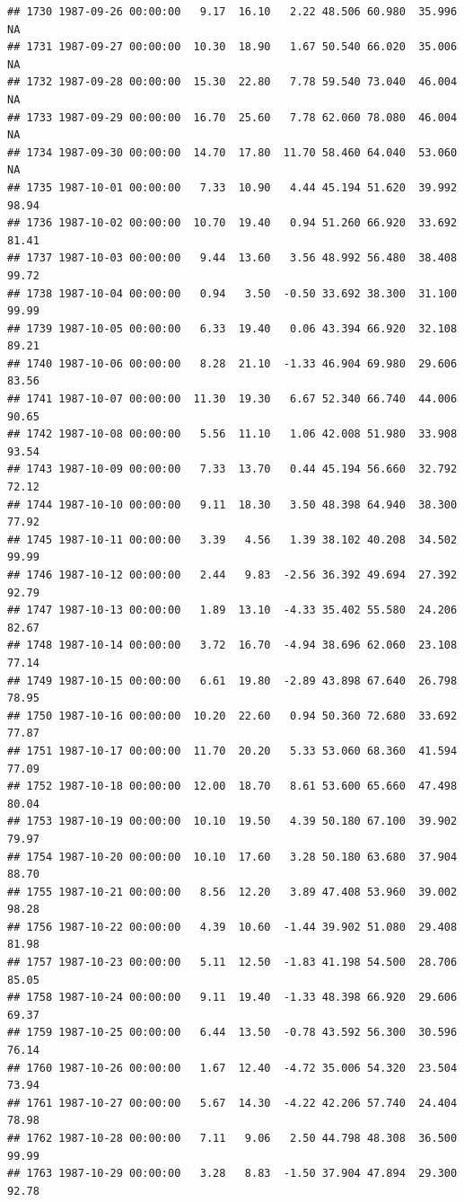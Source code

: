 \documentclass{article}\usepackage{graphicx, color}
\makeatletter
\newenvironment{kframe}{%
 \def\at@end@of@kframe{}%
 \ifinner\ifhmode%
  \def\at@end@of@kframe{\end{minipage}}%
  \begin{minipage}{\columnwidth}%
 \fi\fi%
 \def\FrameCommand##1{\hskip\@totalleftmargin \hskip-\fboxsep
 \colorbox{shadecolor}{##1}\hskip-\fboxsep
     \hskip-\linewidth \hskip-\@totalleftmargin \hskip\columnwidth}%
 \MakeFramed {\advance\hsize-\width
   \@totalleftmargin\z@ \linewidth\hsize
   \@setminipage}}%
 {\par\unskip\endMakeFramed%
 \at@end@of@kframe}
\newenvironment{knitrout}{}{} %
\makeatother
\begin{document}
\begin{knitrout}
\begin{kframe}
\begin{verbatim}
## 1730 1987-09-26 00:00:00   9.17  16.10   2.22 48.506 60.980  35.996     NA
## 1731 1987-09-27 00:00:00  10.30  18.90   1.67 50.540 66.020  35.006     NA
## 1732 1987-09-28 00:00:00  15.30  22.80   7.78 59.540 73.040  46.004     NA
## 1733 1987-09-29 00:00:00  16.70  25.60   7.78 62.060 78.080  46.004     NA
## 1734 1987-09-30 00:00:00  14.70  17.80  11.70 58.460 64.040  53.060     NA
## 1735 1987-10-01 00:00:00   7.33  10.90   4.44 45.194 51.620  39.992  98.94
## 1736 1987-10-02 00:00:00  10.70  19.40   0.94 51.260 66.920  33.692  81.41
## 1737 1987-10-03 00:00:00   9.44  13.60   3.56 48.992 56.480  38.408  99.72
## 1738 1987-10-04 00:00:00   0.94   3.50  -0.50 33.692 38.300  31.100  99.99
## 1739 1987-10-05 00:00:00   6.33  19.40   0.06 43.394 66.920  32.108  89.21
## 1740 1987-10-06 00:00:00   8.28  21.10  -1.33 46.904 69.980  29.606  83.56
## 1741 1987-10-07 00:00:00  11.30  19.30   6.67 52.340 66.740  44.006  90.65
## 1742 1987-10-08 00:00:00   5.56  11.10   1.06 42.008 51.980  33.908  93.54
## 1743 1987-10-09 00:00:00   7.33  13.70   0.44 45.194 56.660  32.792  72.12
## 1744 1987-10-10 00:00:00   9.11  18.30   3.50 48.398 64.940  38.300  77.92
## 1745 1987-10-11 00:00:00   3.39   4.56   1.39 38.102 40.208  34.502  99.99
## 1746 1987-10-12 00:00:00   2.44   9.83  -2.56 36.392 49.694  27.392  92.79
## 1747 1987-10-13 00:00:00   1.89  13.10  -4.33 35.402 55.580  24.206  82.67
## 1748 1987-10-14 00:00:00   3.72  16.70  -4.94 38.696 62.060  23.108  77.14
## 1749 1987-10-15 00:00:00   6.61  19.80  -2.89 43.898 67.640  26.798  78.95
## 1750 1987-10-16 00:00:00  10.20  22.60   0.94 50.360 72.680  33.692  77.87
## 1751 1987-10-17 00:00:00  11.70  20.20   5.33 53.060 68.360  41.594  77.09
## 1752 1987-10-18 00:00:00  12.00  18.70   8.61 53.600 65.660  47.498  80.04
## 1753 1987-10-19 00:00:00  10.10  19.50   4.39 50.180 67.100  39.902  79.97
## 1754 1987-10-20 00:00:00  10.10  17.60   3.28 50.180 63.680  37.904  88.70
## 1755 1987-10-21 00:00:00   8.56  12.20   3.89 47.408 53.960  39.002  98.28
## 1756 1987-10-22 00:00:00   4.39  10.60  -1.44 39.902 51.080  29.408  81.98
## 1757 1987-10-23 00:00:00   5.11  12.50  -1.83 41.198 54.500  28.706  85.05
## 1758 1987-10-24 00:00:00   9.11  19.40  -1.33 48.398 66.920  29.606  69.37
## 1759 1987-10-25 00:00:00   6.44  13.50  -0.78 43.592 56.300  30.596  76.14
## 1760 1987-10-26 00:00:00   1.67  12.40  -4.72 35.006 54.320  23.504  73.94
## 1761 1987-10-27 00:00:00   5.67  14.30  -4.22 42.206 57.740  24.404  78.98
## 1762 1987-10-28 00:00:00   7.11   9.06   2.50 44.798 48.308  36.500  99.99
## 1763 1987-10-29 00:00:00   3.28   8.83  -1.50 37.904 47.894  29.300  92.78

\end{verbatim}
\end{kframe}
\end{knitrout}
\end{document}
